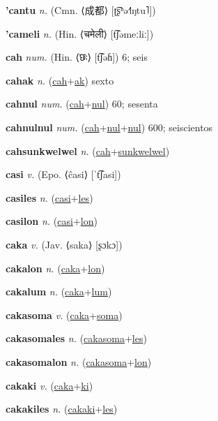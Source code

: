 \textbf{\hypertarget{'cantu}{'cantu}} \textit{n.} (Cmn. ⟨{\chinese{}成都}⟩ [ʈ͡ʂʰə˧˥ŋtu˥])


\textbf{\hypertarget{'cameli}{'cameli}} \textit{n.} (Hin. ⟨{\devanagari{}चमेली}⟩ [t͡ʃəmeːliː])


\textbf{\hypertarget{cah}{cah}} \textit{num.} (Hin. ⟨{\devanagari{}छः}⟩ [t͡ʃəɦ])
6; seis

\textbf{\hypertarget{cahak}{cahak}} \textit{n.} (\hyperlink{cah}{cah}+\allowbreak \hyperlink{ak}{ak})
sexto

\textbf{\hypertarget{cahnul}{cahnul}} \textit{num.} (\hyperlink{cah}{cah}+\allowbreak \hyperlink{nul}{nul})
60; sesenta

\textbf{\hypertarget{cahnulnul}{cahnulnul}} \textit{num.} (\hyperlink{cah}{cah}+\allowbreak \hyperlink{nul}{nul}+\allowbreak \hyperlink{nul}{nul})
600; seiscientos

\textbf{\hypertarget{cahsunkwelwel}{cahsunkwelwel}} \textit{n.} (\hyperlink{cah}{cah}+\allowbreak \hyperlink{sunkwelwel}{sunkwelwel})


\textbf{\hypertarget{casi}{casi}} \textit{v.} (Epo. ⟨ĉasi⟩ [ˈt͡ʃasi])


\textbf{\hypertarget{casiles}{casiles}} \textit{n.} (\hyperlink{casi}{casi}+\allowbreak \hyperlink{les}{les})


\textbf{\hypertarget{casilon}{casilon}} \textit{n.} (\hyperlink{casi}{casi}+\allowbreak \hyperlink{lon}{lon})


\textbf{\hypertarget{caka}{caka}} \textit{v.} (Jav. ⟨saka⟩ [ʂɔkɔ])


\textbf{\hypertarget{cakalon}{cakalon}} \textit{n.} (\hyperlink{caka}{caka}+\allowbreak \hyperlink{lon}{lon})


\textbf{\hypertarget{cakalum}{cakalum}} \textit{n.} (\hyperlink{caka}{caka}+\allowbreak \hyperlink{lum}{lum})


\textbf{\hypertarget{cakasoma}{cakasoma}} \textit{v.} (\hyperlink{caka}{caka}+\allowbreak \hyperlink{soma}{soma})


\textbf{\hypertarget{cakasomales}{cakasomales}} \textit{n.} (\hyperlink{cakasoma}{cakasoma}+\allowbreak \hyperlink{les}{les})


\textbf{\hypertarget{cakasomalon}{cakasomalon}} \textit{n.} (\hyperlink{cakasoma}{cakasoma}+\allowbreak \hyperlink{lon}{lon})


\textbf{\hypertarget{cakaki}{cakaki}} \textit{v.} (\hyperlink{caka}{caka}+\allowbreak \hyperlink{ki}{ki})


\textbf{\hypertarget{cakakiles}{cakakiles}} \textit{n.} (\hyperlink{cakaki}{cakaki}+\allowbreak \hyperlink{les}{les})


